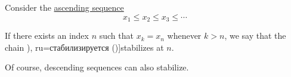 \begin{definition}\label{def:stabilizing_sequence}
  Consider the \hyperref[def:order_function/ascending]{ascending sequence}
  \begin{equation*}
    x_1 \leq x_2 \leq x_3 \leq \cdots
  \end{equation*}

  If there exists an index \( n \) such that \( x_k = x_n \) whenever \( k > n \), we say that the chain \term[bg=стабилизира (\cite[41]{КоцевСидеров2016КомАлгебра}), ru=стабилизируется (\cite[52]{Яблонский2003ДискретнаяМатематика})]{stabilizes} at \( n \).
\end{definition}
\begin{comments}
  \item Of course, descending sequences can also stabilize.
\end{comments}


